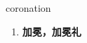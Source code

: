 
\begin{frame}
{\huge coronation}
\begin{center}
\begin{enumerate}\Large
  \item \textbf{加冕，加冕礼}
\end{enumerate}
\end{center}
\end{frame}
